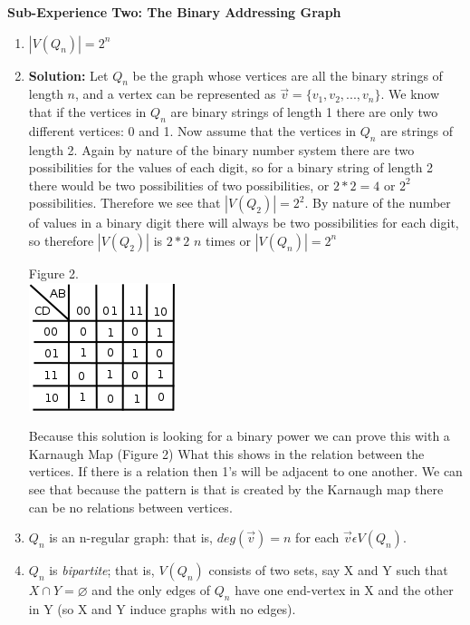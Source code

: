 \documentclass[10pt,a4paper]{report}
\begin{document}
	\textbf{Sub-Experience Two: The Binary Addressing Graph}
		\begin{enumerate}
			\item $|V(Q_n)| = 2^n$
			
			\item[] \textbf{Solution: }Let $Q_{n}$ be the graph whose vertices are all the binary strings of length $n$, and a vertex can be represented as $\vec{v} = \{v_{1}, v_{2}, ..., v_{n}\}$.  We know that if the vertices in $Q_{n}$ are binary strings of length 1 there are only two different vertices: 0 and 1.  Now assume that the vertices in $Q_{n}$ are strings of length 2.  Again by nature of the binary number system there are two possibilities for the values of each digit, so for a binary string of length 2 there would be two possibilities of two possibilities, or $2*2=4$ or $2^{2}$ possibilities.  Therefore we see that $|V(Q_{2})| = 2^{2}$. By nature of the number of values in a binary digit there will always be two possibilities for each digit, so therefore $|V(Q_{2})|$ is $2 * 2$ $n$ times or $|V(Q_{n})|=2^{n}$
			
			\begin{center}
				Figure 2.\\
				\includegraphics[scale=.5]{2_1.png}
			\end{center}
			Because this solution is looking for a binary power we can prove this with a Karnaugh Map (Figure 2) What this shows in the relation between the vertices.  If there is a relation then 1's will be adjacent to one another.  We can see that because the pattern is that is created by the Karnaugh map there can be no relations between vertices.
			\item $Q_n$ is an n-regular graph: that is, $deg (\vec{v}) = n $ for each $\vec{v} \epsilon V(Q_n)$.
			\item $Q_n$ is \textit{bipartite}; that is, $V(Q_n)$ consists of two sets, say X and Y such that $X\cap Y = \varnothing$ and the only edges of $Q_n$ have one end-vertex in X and the other in Y (so X and Y induce graphs with no edges).
			

\end{enumerate}
\end{document}
